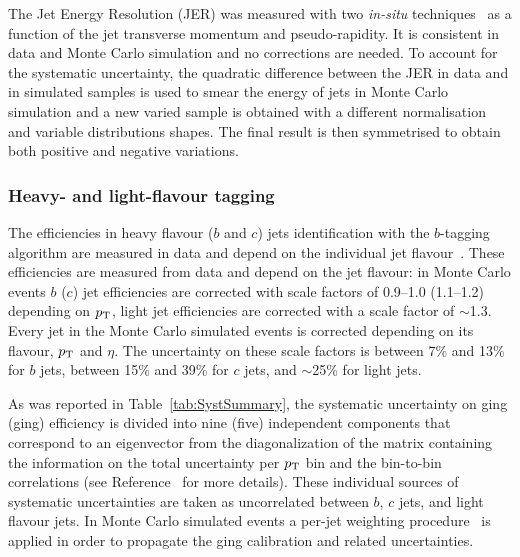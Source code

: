 The Jet Energy Resolution (JER) was measured 
with two {\em in-situ} techniques~\cite{jes}
as a function of the jet transverse momentum and pseudo-rapidity.
It is consistent in data and Monte Carlo simulation and no corrections
are needed.
To account for the systematic uncertainty, the quadratic difference 
between the JER in data and in simulated samples is used
to smear the energy of jets in Monte Carlo simulation and a new
varied sample is obtained with a different normalisation and 
variable distributions shapes. The final result is then symmetrised
to obtain both positive and negative variations.


\subsubsection{Heavy- and light-flavour tagging}
\label{sec:syst_btag}


The efficiencies in heavy flavour ($b$ and $c$) jets identification with
the $b$-tagging algorithm are measured in data and depend on the individual
jet flavour~\cite{btagging,ctagging,ltagging}.
These efficiencies are measured from data and depend on the jet flavour:
in Monte Carlo events $b$ ($c$) jet efficiencies are corrected with scale factors
of 0.9--1.0 (1.1--1.2) depending on $\pt$, light jet efficiencies are corrected 
with a  scale factor of $\sim$1.3.
Every jet in the Monte Carlo simulated events is corrected depending
on its flavour, $\pt$ and $\eta$.
The uncertainty on these scale factors is 
between 7\% and 13\% for $b$ jets, between 15\% and 39\% for $c$ jets,
and $\sim$25\% for light jets.

As was reported in Table~\ref{tab:SystSummary}, the systematic uncertainty
on \btag ging (\ctag ging) efficiency is divided into nine (five) independent 
components that correspond to an eigenvector from the diagonalization of the
matrix containing the information on the total uncertainty 
per $\pt$ bin and the bin-to-bin correlations (see Reference~\cite{VHbb} for
more details).
These individual sources of systematic uncertainties 
are taken as uncorrelated between $b$, $c$ jets, and
light flavour jets. In Monte Carlo simulated events 
a per-jet weighting procedure~\cite{IFAEBtagNote}
is applied in order to propagate the \btag ging calibration
and related uncertainties.

